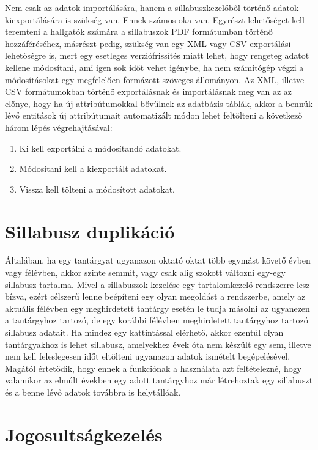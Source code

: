 \documentclass[hidelinks, 12pt, a4paper]{report}
\begin{document}
Nem csak az adatok importálására, hanem a sillabuszkezelőből történő adatok kiexportálására is szükség van. Ennek számos oka van. Egyrészt lehetőséget kell teremteni a hallgatók számára a sillabuszok PDF formátumban történő hozzáféréséhez, másrészt pedig, szükség van egy XML vagy CSV exportálási lehetőségre is, mert egy esetleges verziófrissítés miatt lehet, hogy rengeteg adatot kellene módosítani, ami igen sok időt vehet igénybe, ha nem számítógép végzi a módosításokat egy megfelelően formázott szöveges állományon. Az XML, illetve CSV formátumokban történő exportálásnak és importálásnak meg van az az előnye, hogy ha új attribútumokkal bővülnek az adatbázis táblák, akkor a bennük lévő entitások új attribútumait automatizált módon lehet feltölteni a következő három lépés végrehajtásával:

\begin{enumerate}
\item Ki kell exportálni a módosítandó adatokat.
\item Módosítani kell a kiexportált adatokat.
\item Vissza kell tölteni a módosított adatokat.
\end{enumerate}

\section{Sillabusz duplikáció}

Általában, ha egy tantárgyat ugyanazon oktató oktat több egymást követő évben vagy félévben, akkor szinte semmit, vagy csak alig szokott változni egy-egy sillabusz tartalma. Mivel a sillabuszok kezelése egy tartalomkezelő rendszerre lesz bízva, ezért célszerű lenne beépíteni egy olyan megoldást a rendszerbe, amely az aktuális félévben egy meghirdetett tantárgy esetén le tudja másolni az ugyanezen a tantárgyhoz tartozó, de egy korábbi félévben meghirdetett tantárgyhoz tartozó sillabusz adatait. Ha mindez egy kattintással elérhető, akkor ezentúl olyan tantárgyakhoz is lehet sillabusz, amelyekhez évek óta nem készült egy sem, illetve nem kell feleslegesen időt eltölteni ugyanazon adatok ismételt begépelésével. Magától értetődik, hogy ennek a funkciónak a használata azt feltételezné, hogy valamikor az elmúlt években egy adott tantárgyhoz már létrehoztak egy sillabuszt és a benne lévő adatok továbbra is helytállóak.

\section{Jogosultságkezelés}
\end{document}

